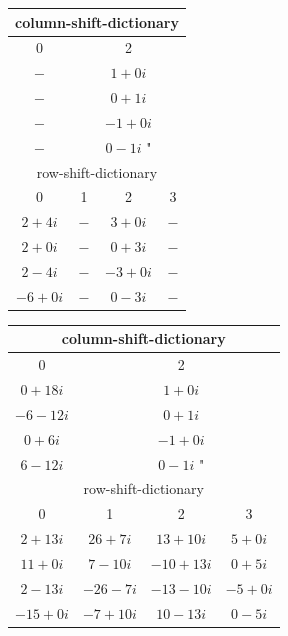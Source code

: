 \documentclass[12pt]{article}
\begin{document}
\begin{figure} [h]
	\begin{center}
		\begin{tabular}{||c c c c||} 
			\hline
			\multicolumn{4}{||c||}{column-shift-dictionary} \\
			\hline
			\hline
			 0 &   & 2 &     \\ [0.5ex] 
			\hline\hline
			 $-$ &  & $1+0i$ &\\
			\hline
			 $-$ &  & $0+1i$ &\\
			\hline
			 $-$ &  & $-1+0i$ &\\
			\hline
			 $-$ &  & $0-1i$ " &\\
			\hline\hline
			\multicolumn{4}{||c||}{row-shift-dictionary} \\
			\hline
			\hline
			 0 & 1 & 2 & 3 \\
			\hline
			 $2+4i$ & $-$ & $3+0i$ & $-$ \\
			\hline
			 $2+0i$ & $-$ & $0+3i$ & $-$ \\
			\hline
			 $2-4i$ & $-$ & $-3+0i$ & $-$ \\
			\hline
			 $-6+0i$ & $-$ & $0-3i$ & $-$ \\
			\hline
		\end{tabular}
	\end{center}
\label{fig::shift_dic_after_4}
\end{figure}

\begin{figure} [H]
\begin{center}
	\begin{tabular}{||c c c c||} 
		\hline
		\multicolumn{4}{||c||}{column-shift-dictionary} \\
		\hline
		\hline
		 0 &  & 2 &    \\ [0.5ex] 
		\hline\hline
		 $0+18i$ &  & $1+0i$ &  \\
		\hline
		 $-6-12i$ &  & $0+1i$ &\\
		\hline
		 $0+6i$ &  & $-1+0i$ & \\
		\hline
		 $6-12i$ &  & $0-1i$ " & \\
		\hline\hline
		\multicolumn{4}{||c||}{row-shift-dictionary} \\
		\hline
		\hline
		 0 & 1 & 2 & 3 \\
		\hline
		 $2+13i$ & $26+7i$ & $13+10i$ & $5+0i$ \\
		\hline
		 $11+0i$ & $7-10i$ & $-10+13i$ & $0+5i$ \\
		\hline
		 $2-13i$ & $-26-7i$ & $-13-10i$ & $-5+0i$ \\
		\hline
		 $-15+0i$ & $-7+10i$ & $10-13i$ & $0-5i$ \\
		\hline
	\end{tabular}
\end{center}
\label{fig::shift_dic_after_all}
\end{figure}
\end{document}

